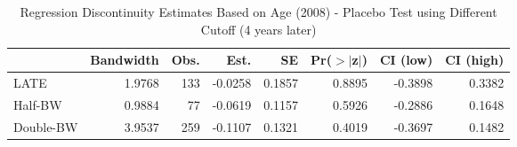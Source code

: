 \begin{table}[ht]
\centering
\begin{tabular}{lrrrrrrr}
  \hline
 & Bandwidth & Obs. & Est. & SE & Pr($>$$|$z$|$) & CI (low) & CI (high) \\ 
  \hline
LATE & 1.9768 & 133 & -0.0258 & 0.1857 & 0.8895 & -0.3898 & 0.3382 \\ 
  Half-BW & 0.9884 & 77 & -0.0619 & 0.1157 & 0.5926 & -0.2886 & 0.1648 \\ 
  Double-BW & 3.9537 & 259 & -0.1107 & 0.1321 & 0.4019 & -0.3697 & 0.1482 \\ 
   \hline
\end{tabular}
\caption{Regression Discontinuity Estimates Based on Age (2008) - Placebo Test using Different Cutoff (4 years later)} 
\label{tab:rd2008y_plac}
\end{table}
